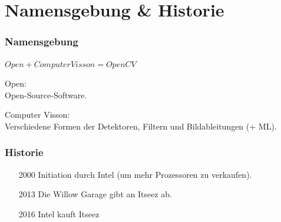 \documentclass{beamer}
\begin{document}
\begin{frame}
\titlepage
\end{frame}

\section{Namensgebung \& Historie}
\begin{frame} \frametitle{Namensgebung}
	$Open + Computer Visson = OpenCV$ 
	\begin{description}
		\item Open:\\
		 Open-Source-Software.
		\item Computer Visson:\\
		 Verschiedene Formen der Detektoren, Filtern und Bildableitungen (+ ML).
	\end{description}
\cite{Bradski2008}
\end{frame}

\begin{frame} \frametitle{Historie}
	\begin{itemize}
		\item [2000] Initiation durch Intel (um mehr Prozessoren zu verkaufen). 
		\item [2013] Die Willow Garage gibt an Itseez ab. 
		\item [2016] Intel kauft Itseez 
	\end{itemize}
	\cite{Bradski2008}
\end{frame}
\end{document}
